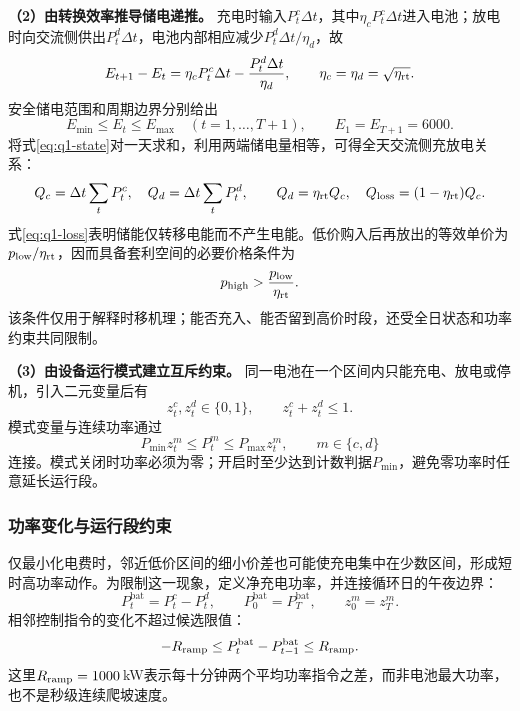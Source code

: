 \documentclass[withoutpreface,bwprint]{cumcmthesis}
\begin{document}
\textbf{（2）由转换效率推导储电递推。}
充电时输入$P_t^c\Delta t$，其中$\eta_cP_t^c\Delta t$进入电池；放电时向交流侧供出$P_t^d\Delta t$，电池内部相应减少$P_t^d\Delta t/\eta_d$，故
\begin{equation}
 E_{t+1}-E_t=\eta_cP_t^c\Delta t-\frac{P_t^d\Delta t}{\eta_d},
 \qquad \eta_c=\eta_d=\sqrt{\eta_{\rm rt}}.
 \label{eq:q1-state}
\end{equation}
安全储电范围和周期边界分别给出
\begin{equation}
 E_{\min}\leq E_t\leq E_{\max}\quad(t=1,\ldots,T+1),
 \qquad E_1=E_{T+1}=6000 .
 \label{eq:q1-boundary}
\end{equation}
将式\eqref{eq:q1-state}对一天求和，利用两端储电量相等，可得全天交流侧充放电关系：
\begin{equation}
 Q_c=\Delta t\sum_tP_t^c,\quad Q_d=\Delta t\sum_tP_t^d,\qquad
 Q_d=\eta_{\rm rt}Q_c,\quad Q_{\rm loss}=(1-\eta_{\rm rt})Q_c.
 \label{eq:q1-loss}
\end{equation}
式\eqref{eq:q1-loss}表明储能仅转移电能而不产生电能。低价购入后再放出的等效单价为$p_{\rm low}/\eta_{\rm rt}$，因而具备套利空间的必要价格条件为
\begin{equation}
 p_{\rm high}>\frac{p_{\rm low}}{\eta_{\rm rt}}.
 \label{eq:q1-arbitrage}
\end{equation}
该条件仅用于解释时移机理；能否充入、能否留到高价时段，还受全日状态和功率约束共同限制。

\textbf{（3）由设备运行模式建立互斥约束。}
同一电池在一个区间内只能充电、放电或停机，引入二元变量后有
\begin{equation}
 z_t^c,z_t^d\in\{0,1\},\qquad z_t^c+z_t^d\leq1 .
 \label{eq:q1-mode}
\end{equation}
模式变量与连续功率通过
\begin{equation}
 P_{\min}z_t^m\leq P_t^m\leq P_{\max}z_t^m,\qquad m\in\{c,d\}
 \label{eq:q1-power}
\end{equation}
连接。模式关闭时功率必须为零；开启时至少达到计数判据$P_{\min}$，避免零功率时任意延长运行段。

\subsubsection{功率变化与运行段约束}
仅最小化电费时，邻近低价区间的细小价差也可能使充电集中在少数区间，形成短时高功率动作。为限制这一现象，定义净充电功率，并连接循环日的午夜边界：
\begin{equation}
 P_t^{\mathrm{bat}}=P_t^c-P_t^d,\qquad
 P_0^{\mathrm{bat}}=P_T^{\mathrm{bat}},\qquad z_0^m=z_T^m .
 \label{eq:q1-net}
\end{equation}
相邻控制指令的变化不超过候选限值：
\begin{equation}
 -R_{\rm ramp}\leq P_t^{\mathrm{bat}}-P_{t-1}^{\mathrm{bat}}\leq R_{\rm ramp}.
 \label{eq:q1-ramp}
\end{equation}
这里$R_{\rm ramp}=1000$\,kW表示每十分钟两个平均功率指令之差，而非电池最大功率，也不是秒级连续爬坡速度。
\end{document}
